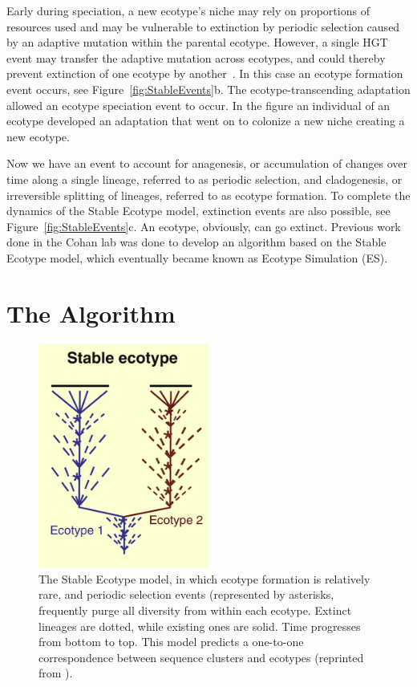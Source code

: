 Early during speciation, a new ecotype's niche may rely on proportions of resources used and may be vulnerable to extinction by periodic selection caused by an adaptive mutation within the parental ecotype.
However, a single HGT event may transfer the adaptive mutation across ecotypes, and could thereby prevent extinction of one ecotype by another~\cite{cohan2008origins}.
In this case an ecotype formation event occurs, see Figure~\ref{fig:StableEvents}b.
The ecotype-transcending adaptation allowed an ecotype speciation event to occur. In the figure an individual of an ecotype developed an adaptation that went on to colonize a new niche creating a new ecotype.

Now we have an event to account for anagenesis, or accumulation of changes over time along a single lineage, referred to as periodic selection, and cladogenesis, or irreversible splitting of lineages, referred to as ecotype formation.
To complete the dynamics of the Stable Ecotype model, extinction events are also possible, see Figure~\ref{fig:StableEvents}c.
An ecotype, obviously, can go extinct.
Previous work done in the Cohan lab was done to develop an algorithm based on the Stable Ecotype model, which eventually became known as Ecotype Simulation (ES).


\section{The Algorithm}

\begin{figure}
 \caption[Phylogenetic tree representation of typical Stable Ecotype model case.]{ The Stable Ecotype model, in which ecotype formation is relatively rare, and periodic selection events (represented by asterisks, frequently purge all diversity from within each ecotype. Extinct lineages are dotted, while existing ones are solid. Time progresses from bottom to top. This model predicts a one-to-one correspondence between sequence clusters and ecotypes (reprinted from \protect\cite{cohan2008origins}). }
 \centering
 \label{fig:StableTree}
 \includegraphics[width=0.5\textwidth]{images/StableTree-CH2}
\end{figure}

